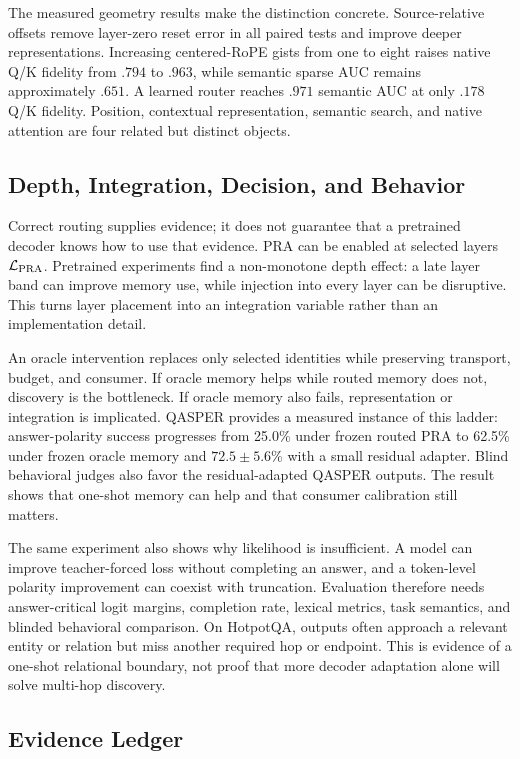 The measured geometry results make the distinction concrete. Source-relative offsets remove
layer-zero reset error in all paired tests and improve deeper representations. Increasing
centered-RoPE gists from one to eight raises native Q/K fidelity from $.794$ to $.963$, while
semantic sparse AUC remains approximately $.651$. A learned router reaches $.971$ semantic
AUC at only $.178$ Q/K fidelity. Position, contextual representation, semantic search, and
native attention are four related but distinct objects.

\subsection{Depth, Integration, Decision, and Behavior}

Correct routing supplies evidence; it does not guarantee that a pretrained decoder knows how
to use that evidence. PRA can be enabled at selected layers $\mathcal L_{\rm PRA}$. Pretrained
experiments find a non-monotone depth effect: a late layer band can improve memory use, while
injection into every layer can be disruptive. This turns layer placement into an integration
variable rather than an implementation detail.

An oracle intervention replaces only selected identities while preserving transport, budget,
and consumer. If oracle memory helps while routed memory does not, discovery is the bottleneck.
If oracle memory also fails, representation or integration is implicated. QASPER provides a
measured instance of this ladder: answer-polarity success progresses from 25.0\% under frozen
routed PRA to 62.5\% under frozen oracle memory and $72.5\pm5.6$\% with a small residual
adapter. Blind behavioral judges also favor the residual-adapted QASPER outputs. The result
shows that one-shot memory can help and that consumer calibration still matters.

The same experiment also shows why likelihood is insufficient. A model can improve
teacher-forced loss without completing an answer, and a token-level polarity improvement can
coexist with truncation. Evaluation therefore needs answer-critical logit margins, completion
rate, lexical metrics, task semantics, and blinded behavioral comparison. On HotpotQA, outputs
often approach a relevant entity or relation but miss another required hop or endpoint. This
is evidence of a one-shot relational boundary, not proof that more decoder adaptation alone
will solve multi-hop discovery.

\subsection{Evidence Ledger}

